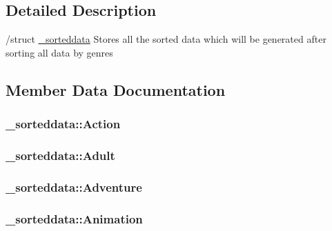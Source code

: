 \subsection{Detailed Description}
/struct \hyperlink{struct__sorteddata}{\+\_\+sorteddata} Stores all the sorted data which will be generated after sorting all data by genres 

\subsection{Member Data Documentation}
\hypertarget{struct__sorteddata_ac35a05059902c08b35d0cf6ddba30839}{}
\subsubsection[{Action}]{ \+\_\+sorteddata\+::\+Action}\label{struct__sorteddata_ac35a05059902c08b35d0cf6ddba30839}
\hypertarget{struct__sorteddata_a3b495166a8e4fbcc71e5a63f6e3ca116}{}
\subsubsection[{Adult}]{ \+\_\+sorteddata\+::\+Adult}\label{struct__sorteddata_a3b495166a8e4fbcc71e5a63f6e3ca116}
\hypertarget{struct__sorteddata_ad915dde9b56463705f2529d9b126501f}{}
\subsubsection[{Adventure}]{ \+\_\+sorteddata\+::\+Adventure}\label{struct__sorteddata_ad915dde9b56463705f2529d9b126501f}
\hypertarget{struct__sorteddata_aa85f461e82c11b4ff8ed457af979df0d}{}
\subsubsection[{Animation}]{ \+\_\+sorteddata\+::\+Animation}\label{struct__sorteddata_aa85f461e82c11b4ff8ed457af979df0d}
\hypertarget{struct__sorteddata_ade33d30d5aee90e955e06c737a37f5b1}{}

